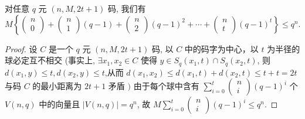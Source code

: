\begin{theorem}[Hamming界]
对任意 $ q $ 元 $ (n, M, 2 t+1) $ 码, 我们有
$$
M\left\{\left(\begin{array}{c}
n \\
0
\end{array}\right)+\left(\begin{array}{c}
n \\
1
\end{array}\right)(q-1)+\left(\begin{array}{c}
n \\
2
\end{array}\right)(q-1)^{2}+\cdots+\left(\begin{array}{c}
n \\
t
\end{array}\right)(q-1)^{t}\right\} \leq q^{n} \text {. }
$$
\end{theorem}
\begin{proof}
设 $ C $ 是一个 $ q $ 元 $ (n, M, 2 t+1) $ 码, 以 $ C $ 中的码字为中心，以 $ t $ 为半径的球必定互不相交 (事实上, $ \exists x_{1}, x_{2} \in C $ 使得 $ y \in S_{q}\left(x_{1}, t\right) \cap S_{q}\left(x_{2}, t\right) $, 则 $ d\left(x_{1}, y\right) \leq t, d\left(x_{2}, y\right) \leq t $,从而 $ d\left(x_{1}, x_{2}\right) \leq d\left(x_{1}, t\right)+d\left(x_{2}, t\right) \leq t+t=2 t $ 与码 $ C $ 的最小距离为 $ 2 t+1 $ 矛盾 $ ) $
由于每个球中含有 $ \sum\limits_{i=0}^{t}\left(\begin{array}{c}n \\ i\end{array}\right)(q-1)^{i} $ 个 $ V(n, q) $ 中的向量且 $ |V(n, q)|=q^{n} $, 故 $ M \sum\limits_{i=0}^{t}\left(\begin{array}{c}n \\ i\end{array}\right)(q-1)^{i} \leq q^{n} $.
\end{proof}


